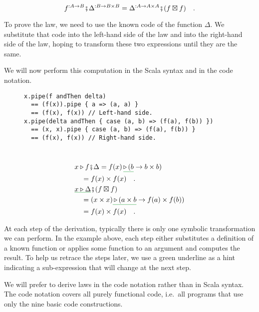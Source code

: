 ~\vspace{-0.3\baselineskip}
\[
f^{:A\rightarrow B}\bef\Delta^{:B\rightarrow B\times B}=\Delta^{:A\rightarrow A\times A}\bef(f\boxtimes f)\quad.
\]

\noindent To prove the law, we need to use the known code of the function
$\Delta$. We substitute that code into the left-hand side of the
law and into the right-hand side of the law, hoping to transform these
two expressions until they are the same.

We will now perform this computation in the Scala syntax and in the
code notation.

\begin{wrapfigure}{L}{0.6\columnwidth}%
\vspace{-0.6\baselineskip}
\begin{lstlisting}
x.pipe(f andThen delta)
  == (f(x)).pipe { a => (a, a) }
  == (f(x), f(x)) // Left-hand side.
x.pipe(delta andThen { case (a, b) => (f(a), f(b)) })
  == (x, x).pipe { case (a, b) => (f(a), f(b)) }
  == (f(x), f(x)) // Right-hand side.
\end{lstlisting}
\vspace{-3\baselineskip}
\end{wrapfigure}%

~\vspace{-1.4\baselineskip}
\begin{align*}
 & x\triangleright f\bef\Delta=f(x)\,\gunderline{\triangleright\,(b}\rightarrow b\times b)\\
 & \quad=f(x)\times f(x)\quad.\\
 & \gunderline{x\triangleright\Delta}\bef(f\boxtimes f)\\
 & \quad=(x\times x)\gunderline{\,\triangleright\,(a\times b}\rightarrow f(a)\times f(b))\\
 & \quad=f(x)\times f(x)\quad.
\end{align*}
\vspace{-1.5\baselineskip}

At each step of the derivation, typically there is only one symbolic
transformation we can perform. In the example above, each step either
substitutes a definition of a known function or applies some function
to an argument and computes the result. To help us retrace the steps
later, we use a green underline as a hint indicating a sub-expression
that will change at the next step. 

We will prefer to derive laws in the code notation rather than in
Scala syntax. The code notation covers all purely functional code,
i.e.~all programs that use only the nine basic code constructions.

